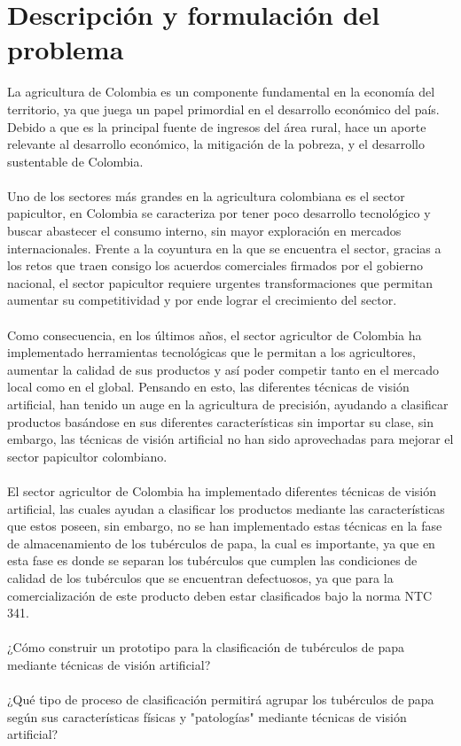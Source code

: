 \section{Descripción y formulación del problema}
La agricultura de Colombia es un componente fundamental en la economía del territorio, ya que juega un papel primordial en el desarrollo económico del país. Debido a que es la principal fuente de ingresos del área rural, hace un aporte relevante al desarrollo económico, la mitigación de la pobreza, y el desarrollo sustentable de Colombia.
\\
\\
Uno de los sectores más grandes en la agricultura colombiana es el sector papicultor, en Colombia se caracteriza por tener poco desarrollo tecnológico y buscar abastecer el consumo interno, sin mayor exploración en mercados internacionales. Frente a la coyuntura en la que se encuentra el sector, gracias a los retos que traen consigo los acuerdos comerciales firmados por el gobierno nacional, el sector papicultor requiere urgentes transformaciones que permitan aumentar su competitividad y por ende lograr el crecimiento del sector.
\\
\\
Como consecuencia, en los últimos años, el sector agricultor de Colombia ha implementado herramientas tecnológicas que le permitan a los agricultores, aumentar la calidad de sus productos y así poder competir tanto en el mercado local como en el global. Pensando en esto, las diferentes técnicas de visión artificial, han tenido un auge en la agricultura de precisión, ayudando a clasificar productos basándose en sus diferentes características sin importar su clase, sin embargo, las técnicas de visión artificial no han sido aprovechadas para mejorar el sector papicultor colombiano.
\\
\\
El sector agricultor de Colombia ha implementado diferentes técnicas de visión artificial, las cuales ayudan a clasificar los productos mediante las características que estos poseen, sin embargo, no se han implementado estas técnicas en la fase de almacenamiento de los tubérculos de papa, la cual es importante, ya que en esta fase es donde se separan los tubérculos que cumplen las condiciones de calidad de los tubérculos que se encuentran defectuosos, ya que para la comercialización de este producto deben estar clasificados bajo la norma NTC 341.
\\
\\ 
¿Cómo construir un prototipo para la clasificación de tubérculos de papa mediante técnicas de visión artificial?
\\
\\
¿Qué tipo de proceso de clasificación permitirá agrupar los tubérculos de papa según sus características físicas y "patologías" mediante técnicas de visión artificial?	


